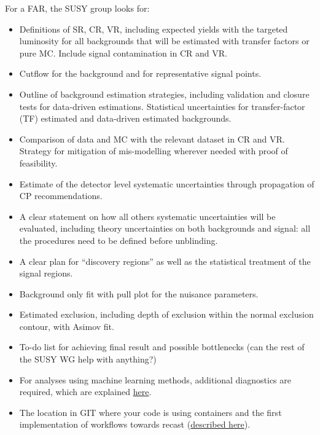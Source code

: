 For a FAR, the SUSY group looks for:
\begin{itemize}
\item Definitions of SR, CR, VR, including expected yields with the targeted luminosity for all backgrounds that will be estimated with transfer factors or pure MC\@.
    Include signal contamination in CR and VR\@.
\item Cutflow for the background and for representative signal points.
\item Outline of background estimation strategies, including validation and closure tests for data-driven estimations. Statistical uncertainties for transfer-factor (TF) estimated and data-driven estimated backgrounds.
\item Comparison of data and MC with the relevant dataset in CR and VR\@. Strategy for mitigation of mis-modelling wherever needed with proof of feasibility.
\item Estimate of the detector level systematic uncertainties through propagation of CP recommendations.
\item A clear statement on how all others systematic uncertainties will be evaluated, including theory uncertainties on both backgrounds and signal: all the procedures need to be defined before unblinding.
\item A clear plan for ``discovery regions'' as well as the statistical treatment of the signal regions.
\item Background only fit with pull plot for the nuisance parameters.
\item Estimated exclusion, including depth of exclusion within the normal exclusion contour, with Asimov fit.
\item To-do list for achieving final result and possible bottlenecks (can the rest of the SUSY WG help with anything?)
\item For analyses using machine learning methods, additional diagnostics are required, which are explained \href{https://twiki.cern.ch/twiki/bin/view/AtlasProtected/SusyMachineLearning}{here}.
\item The location in GIT where your code is using containers and the first implementation of workflows towards recast (\href{https://recast-docs.web.cern.ch/recast-docs/workflowauthoring/intro/}{described here}).
\end{itemize}

